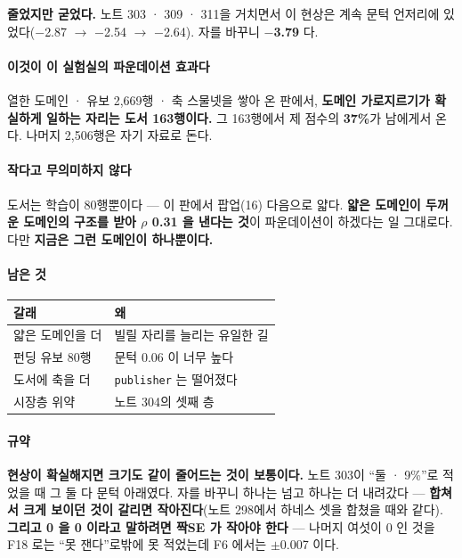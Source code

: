 \documentclass[10pt]{article}
\begin{document}
\textbf{줄었지만 굳었다.} 노트 303 · 309 · 311을 거치면서 이 현상은 계속
문턱 언저리에 있었다($-$2.87 $\to$ $-$2.54 $\to$ $-$2.64). 자를 바꾸니
\textbf{$-$3.79} 다.

\paragraph{이것이 이 실험실의 파운데이션 효과다} 열한 도메인 · 유보
2,669행 · 축 스물넷을 쌓아 온 판에서, \textbf{도메인 가로지르기가 확실하게
일하는 자리는 도서 163행이다.} 그 163행에서 제 점수의 \textbf{37\%}가
남에게서 온다. 나머지 2,506행은 자기 자료로 돈다.

\paragraph{작다고 무의미하지 않다} 도서는 학습이 80행뿐이다 --- 이 판에서
팝업(16) 다음으로 얇다. \textbf{얇은 도메인이 두꺼운 도메인의 구조를 받아
$\rho$ 0.31 을 낸다는 것}이 파운데이션이 하겠다는 일 그대로다. 다만
\textbf{지금은 그런 도메인이 하나뿐이다.}

\paragraph{남은 것}
\begin{center}\small
\begin{tabular}{ll}
\hline
갈래 & 왜 \\
\hline
얇은 도메인을 더 & 빌릴 자리를 늘리는 유일한 길 \\
펀딩 유보 80행 & 문턱 0.06 이 너무 높다 \\
도서에 축을 더 & \texttt{publisher} 는 떨어졌다 \\
시장층 위약 & 노트 304의 셋째 층 \\
\hline
\end{tabular}
\end{center}

\paragraph{규약} \textbf{현상이 확실해지면 크기도 같이 줄어드는 것이
보통이다.} 노트 303이 ``둘 · 9\%''로 적었을 때 그 둘 다 문턱 아래였다.
자를 바꾸니 하나는 넘고 하나는 더 내려갔다 --- \textbf{합쳐서 크게 보이던
것이 갈리면 작아진다}(노트 298에서 하네스 셋을 합쳤을 때와 같다).
\textbf{그리고 0 을 0 이라고 말하려면 짝SE 가 작아야 한다} --- 나머지 여섯이
0 인 것을 F18 로는 ``못 잰다''로밖에 못 적었는데 F6 에서는 $\pm$0.007 이다.
\end{document}

